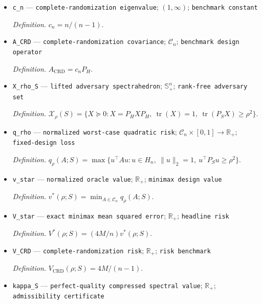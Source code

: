 \documentclass{article}
\begin{document}
\begin{itemize}
  \par\smallskip\noindent\emph{Definition.} \(\mathcal Y(\rho,M;S)=\{\mu\in H_n:\|\mu\|_2^2=nM,\ \|P_S\mu\|_2^2\geq\rho^2\|\mu\|_2^2\}\).
  \item \texttt{c\_\allowbreak{}n} --- \texttt{complete-\allowbreak{}randomization eigenvalue}; \((1,\infty)\); \texttt{benchmark constant}
  \par\smallskip\noindent\emph{Definition.} \(c_n=n/(n-1)\).
  \item \texttt{A\_\allowbreak{}CRD} --- \texttt{complete-\allowbreak{}randomization covariance}; \(\mathcal C_n\); \texttt{benchmark design operator}
  \par\smallskip\noindent\emph{Definition.} \(A_{\mathrm{CRD}}=c_nP_H\).
  \item \texttt{X\_\allowbreak{}rho\_\allowbreak{}S} --- \texttt{lifted adversary spectrahedron}; \(\mathbb S_+^n\); \texttt{rank-\allowbreak{}free adversary set}
  \par\smallskip\noindent\emph{Definition.} \(\mathcal X_\rho(S)=\{X\succeq0:X=P_HXP_H,\ \operatorname{tr}(X)=1,\ \operatorname{tr}(P_SX)\geq\rho^2\}\).
  \item \texttt{q\_\allowbreak{}rho} --- \texttt{normalized worst-\allowbreak{}case quadratic risk}; \(\mathcal C_n\times[0,1]\to\mathbb R_+\); \texttt{fixed-\allowbreak{}design loss}
  \par\smallskip\noindent\emph{Definition.} \(q_\rho(A;S)=\max\{u^\top Au:u\in H_n,\ \|u\|_2=1,\ u^\top P_Su\geq\rho^2\}\).
  \item \texttt{v\_\allowbreak{}star} --- \texttt{normalized oracle value}; \(\mathbb R_+\); \texttt{minimax design value}
  \par\smallskip\noindent\emph{Definition.} \(v^*(\rho;S)=\min_{A\in\mathcal C_n}q_\rho(A;S)\).
  \item \texttt{V\_\allowbreak{}star} --- \texttt{exact minimax mean squared error}; \(\mathbb R_+\); \texttt{headline risk}
  \par\smallskip\noindent\emph{Definition.} \(V^*(\rho;S)=(4M/n)v^*(\rho;S)\).
  \item \texttt{V\_\allowbreak{}CRD} --- \texttt{complete-\allowbreak{}randomization risk}; \(\mathbb R_+\); \texttt{risk benchmark}
  \par\smallskip\noindent\emph{Definition.} \(V_{\mathrm{CRD}}(\rho;S)=4M/(n-1)\).
  \item \texttt{kappa\_\allowbreak{}S} --- \texttt{perfect-\allowbreak{}quality compressed spectral value}; \(\mathbb R_+\); \texttt{admissibility certificate}

\end{itemize}
\end{document}
